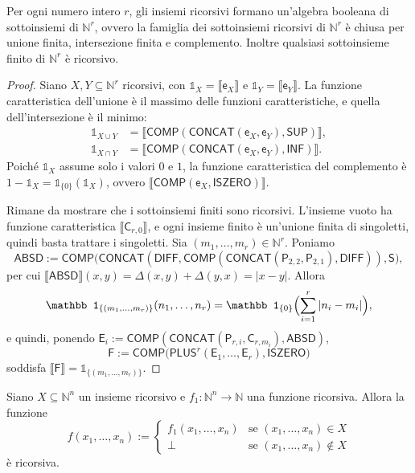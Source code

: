 \begin{prop}
Per ogni numero intero $r$, gli insiemi ricorsivi formano un'algebra booleana di sottoinsiemi di $\mathbb N^r$,
ovvero la famiglia dei sottoinsiemi ricorsivi di $\mathbb N^r$ è chiusa per unione finita, intersezione finita e complemento.
Inoltre qualsiasi sottoinsieme finito di $\mathbb N^r$ è ricorsivo.
\end{prop}

\begin{proof}
Siano $X,Y\subseteq\mathbb N^r$ ricorsivi, con $\mathbb 1_X=\llbracket\mathsf e_X\rrbracket$ e $\mathbb 1_Y=\llbracket\mathsf e_Y\rrbracket$.
La funzione caratteristica dell'unione è il massimo delle funzioni caratteristiche, e quella dell'intersezione è il minimo:
\begin{align*}
\mathbb 1_{X\cup Y}&=\llbracket\mathsf{COMP}(\mathsf{CONCAT}(\mathsf e_X,\mathsf e_Y),\mathsf{SUP})\rrbracket,\\
\mathbb 1_{X\cap Y}&=\llbracket\mathsf{COMP}(\mathsf{CONCAT}(\mathsf e_X,\mathsf e_Y),\mathsf{INF})\rrbracket.
\end{align*}
Poiché $\mathbb 1_X$ assume solo i valori $0$ e $1$, la funzione caratteristica del complemento è $1-\mathbb 1_X=\mathbb 1_{\{0\}}(\mathbb 1_X)$, ovvero $\llbracket\mathsf{COMP}(\mathsf e_X,\mathsf{ISZERO})\rrbracket$.

Rimane da mostrare che i sottoinsiemi finiti sono ricorsivi. L'insieme vuoto ha funzione caratteristica $\llbracket\mathsf C_{r,0}\rrbracket$, e ogni insieme finito è un'unione finita di singoletti, quindi basta trattare i singoletti.
Sia $(m_1,\dots,m_r)\in\mathbb N^r$. Poniamo
\[
\mathsf{ABSD}:=\mathsf{COMP}\bigl(\mathsf{CONCAT}(\mathsf{DIFF},\mathsf{COMP}(\mathsf{CONCAT}(\mathsf P_{2,2},\mathsf P_{2,1}),\mathsf{DIFF})),\mathsf S\bigr),
\]
per cui $\llbracket\mathsf{ABSD}\rrbracket(x,y)=\Delta(x,y)+\Delta(y,x)=|x-y|$. Allora
\[
\mathbb 1_{\{(m_1,\dots,m_r)\}}(n_1,\dots,n_r)=\mathbb 1_{\{0\}}\Bigl(\sum_{i=1}^r|n_i-m_i|\Bigr),
\]
e quindi, ponendo $\mathsf E_i:=\mathsf{COMP}(\mathsf{CONCAT}(\mathsf P_{r,i},\mathsf C_{r,m_i}),\mathsf{ABSD})$,
\[
\mathsf F:=\mathsf{COMP}\bigl(\mathsf{PLUS}^r(\mathsf E_1,\dots,\mathsf E_r),\mathsf{ISZERO}\bigr)
\]
soddisfa $\llbracket\mathsf F\rrbracket=\mathbb 1_{\{(m_1,\dots,m_r)\}}$.
\end{proof}

\begin{prop}
Siano $X\subseteq\mathbb N^n$ un insieme ricorsivo e $f_1\colon\mathbb N^n\to\mathbb N$ una funzione ricorsiva. Allora la funzione
\[
f(x_1,\dots,x_n):=
\begin{cases}
f_1(x_1,\dots,x_n) & \text{se } (x_1,\dots,x_n)\in X\\
\bot & \text{se } (x_1,\dots,x_n)\notin X
\end{cases}
\]
è ricorsiva.
\end{prop}

